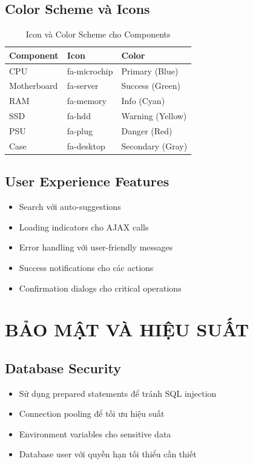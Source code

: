 \documentclass[12pt,a4paper]{article}
\begin{document}
\subsection{Color Scheme và Icons}
\begin{table}[h]
\centering
\begin{tabular}{@{}lll@{}}
\toprule
\textbf{Component} & \textbf{Icon} & \textbf{Color} \\
\midrule
CPU & fa-microchip & Primary (Blue) \\
Motherboard & fa-server & Success (Green) \\
RAM & fa-memory & Info (Cyan) \\
SSD & fa-hdd & Warning (Yellow) \\
PSU & fa-plug & Danger (Red) \\
Case & fa-desktop & Secondary (Gray) \\
\bottomrule
\end{tabular}
\caption{Icon và Color Scheme cho Components}
\end{table}

\subsection{User Experience Features}
\begin{itemize}
    \item Search với auto-suggestions
    \item Loading indicators cho AJAX calls
    \item Error handling với user-friendly messages
    \item Success notifications cho các actions
    \item Confirmation dialogs cho critical operations
\end{itemize}

\section{BẢO MẬT VÀ HIỆU SUẤT}

\subsection{Database Security}
\begin{itemize}
    \item Sử dụng prepared statements để tránh SQL injection
    \item Connection pooling để tối ưu hiệu suất
    \item Environment variables cho sensitive data
    \item Database user với quyền hạn tối thiểu cần thiết
\end{itemize}
\end{document}
